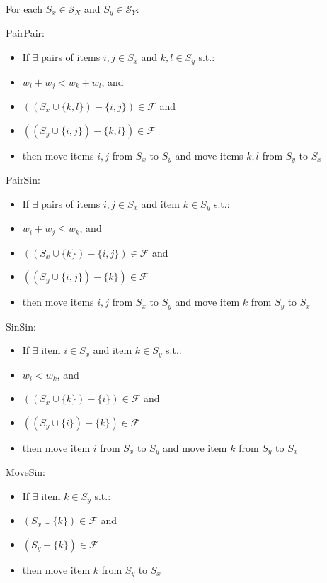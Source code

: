 \documentclass{elsarticle}
\begin{document}
For each $S_x \in \mathcal{S}_X$ and $S_y \in \mathcal{S}_Y$:

PairPair:
\begin{itemize}
	\item If $\exists$ pairs of items $i,j \in S_x$ and $k, l \in S_y$ s.t.:
	\item $w_i + w_j < w_k + w_l$, and
	\item $((S_x \cup \{k, l\}) - \{i, j\}) \in \mathcal{F}$ and
	\item $((S_y \cup \{i, j\}) - \{k, l\}) \in \mathcal{F}$
	\item then move items $i, j$ from $S_x$ to $S_y$ and move items $k, l$ from $S_y$ to $S_x$	
\end{itemize}

PairSin:
\begin{itemize}
	\item If $\exists$ pairs of items $i,j \in S_x$ and item $k \in S_y$ s.t.:
	\item $w_i + w_j \leq w_k$, and
	\item $((S_x \cup \{k\}) - \{i, j\}) \in \mathcal{F}$ and
	\item $((S_y \cup \{i, j\}) - \{k\}) \in \mathcal{F}$
	\item then move items $i, j$ from $S_x$ to $S_y$ and move item $k$ from $S_y$ to $S_x$	
\end{itemize}

SinSin:
\begin{itemize}
	\item If $\exists$ item $i \in S_x$ and item $k \in S_y$ s.t.:
	\item $w_i < w_k$, and
	\item $((S_x \cup \{k\}) - \{i\}) \in \mathcal{F}$ and
	\item $((S_y \cup \{i\}) - \{k\}) \in \mathcal{F}$
	\item then move item $i$ from $S_x$ to $S_y$ and move item $k$ from $S_y$ to $S_x$	
\end{itemize}

MoveSin:
\begin{itemize}
	\item If $\exists$ item $k \in S_y$ s.t.:
	\item $(S_x \cup \{k\}) \in \mathcal{F}$ and
	\item $(S_y - \{k\}) \in \mathcal{F}$
	\item then move item $k$ from $S_y$ to $S_x$	
\end{itemize}
\end{document}
